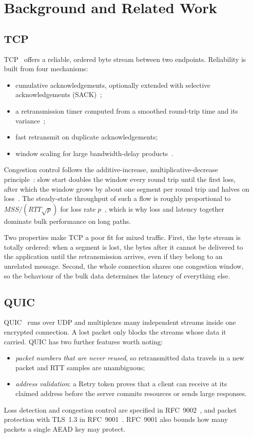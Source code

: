 \chapter{Background and Related Work}\label{ch:background}

\section{TCP}

TCP~\cite{rfc9293} offers a reliable, ordered byte stream between two endpoints. Reliability is built from four
mechanisms:
\begin{itemize}
  \item cumulative acknowledgements, optionally extended with selective acknowledgements (SACK)~\cite{rfc2018};
  \item a retransmission timer computed from a smoothed round-trip time and its variance~\cite{rfc6298};
  \item fast retransmit on duplicate acknowledgements;
  \item window scaling for large bandwidth-delay products~\cite{rfc7323}.
\end{itemize}
Congestion control follows the additive-increase, multiplicative-decrease principle~\cite{jacobson,chiu-jain}:
slow start doubles the window every round trip until the first loss, after which the window grows by about one
segment per round trip and halves on loss~\cite{rfc5681}. The steady-state throughput of such a flow is roughly
proportional to $\mathit{MSS}/(\mathit{RTT}\sqrt{p})$ for loss rate $p$~\cite{mathis}, which is why loss and
latency together dominate bulk performance on long paths.

Two properties make TCP a poor fit for mixed traffic. First, the byte stream is totally ordered: when a segment
is lost, the bytes after it cannot be delivered to the application until the retransmission arrives, even if
they belong to an unrelated message. Second, the whole connection shares one congestion window, so the
behaviour of the bulk data determines the latency of everything else.

\section{QUIC}

QUIC~\cite{rfc9000,quic-design} runs over UDP and multiplexes many independent streams inside one encrypted
connection. A lost packet only blocks the streams whose data it carried. QUIC has two further features worth
noting:
\begin{itemize}
  \item \emph{packet numbers that are never reused}, so retransmitted data travels in a new packet and RTT
    samples are unambiguous;
  \item \emph{address validation}: a Retry token proves that a client can receive at its claimed address before
    the server commits resources or sends large responses.
\end{itemize}
Loss detection and congestion control are specified in RFC~9002~\cite{rfc9002}, and packet protection with
TLS~1.3 in RFC~9001~\cite{rfc9001,rfc8446}. RFC~9001 also bounds how many packets a single AEAD key may protect.

